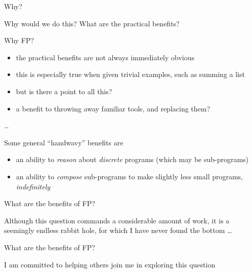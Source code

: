 \begin{frame}
\begin{block}{Why?}
\begin{center}
Why would we do this? What are the practical benefits?
\end{center}
\end{block}
\end{frame}

\begin{frame}
\begin{block}{Why FP?}
\begin{center}
\begin{itemize}
\item<1-> the practical benefits are not always immediately obvious
\item<2-> this is especially true when given trivial examples, such as summing a list
\item<3-> but is there a point to all this?
\item<4-> a benefit to throwing away familiar tools, and replacing them?
\end{itemize}
\end{center}
\end{block}
\end{frame}

\begin{frame}
\begin{center}
\ldots
\end{center}
\end{frame}

\begin{frame}
\begin{block}{Some general ``handwavy'' benefits are}
\begin{center}
\begin{itemize}
\item<1-> an ability to \emph{reason} about \emph{discrete} programs (which may be sub-programs)
\item<2-> an ability to \emph{compose} sub-programs to make slightly less small programs, \emph{indefinitely}
\end{itemize}
\end{center}
\end{block}
\end{frame}

\begin{frame}
\begin{block}{What are the benefits of FP?}
\begin{center}
Although this question commands a considerable amount of work, it is a seemingly endless rabbit hole, for which I have never found the bottom \ldots
\end{center}
\end{block}
\end{frame}

\begin{frame}
\begin{block}{What are the benefits of FP?}
\begin{center}
I am committed to helping others join me in exploring this question
\end{center}
\end{block}
\end{frame}
